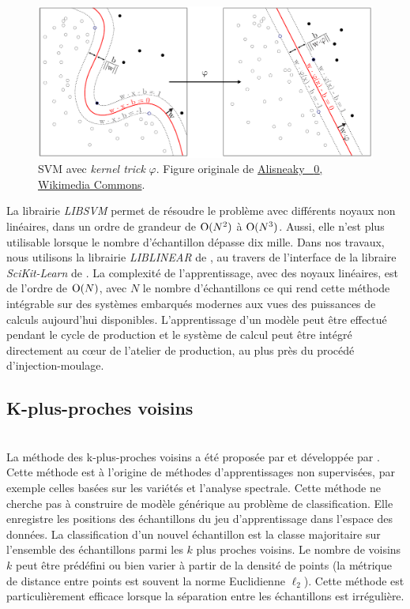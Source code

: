 \begin{figure}[hbtp]
	\centering
	\includegraphics[width=\textwidth,height=\textheight,keepaspectratio]{../Chap4/Figures/Kernel_Machine_Pierre.pdf}
	\caption{SVM avec \emph{kernel trick} $\varphi$. Figure originale de \href{https://commons.wikimedia.org/wiki/File:Kernel_Machine.png}{Alisneaky \ccLogo \ \textnormal{0}, Wikimedia Commons}.}
	\label{fig:svm}
\end{figure}

La librairie \textit{LIBSVM} \cite{chang_libsvm_2011} permet de résoudre le problème avec différents noyaux non linéaires, dans un ordre de grandeur de $\operatorname{O}(N^2)$ à $\operatorname{O}(N^3)$.
Aussi, elle n'est plus utilisable lorsque le nombre d'échantillon dépasse dix mille.
Dans nos travaux, nous utilisons la librairie \textit{LIBLINEAR} de \citeauthor{fan_liblinear_2008} \cite{fan_liblinear_2008}, au travers de l'interface de la libraire \textit{SciKit-Learn} de \citeauthor{pedregosa_scikit-learn_2011} \cite{pedregosa_scikit-learn_2011}.
La complexité de l'apprentissage, avec des noyaux linéaires, est de l'ordre de $\operatorname{O}(N)$, avec $N$ le nombre d'échantillons ce qui rend cette méthode intégrable sur des systèmes embarqués modernes aux vues des puissances de calculs aujourd'hui disponibles.
L'apprentissage d'un modèle peut être effectué pendant le cycle de production et le système de calcul peut être intégré directement au cœur de l'atelier de production, au plus près du procédé d'injection-moulage.

\subsection{K-plus-proches voisins} \mbox{} \label{parag:knn} \\
La méthode des k-plus-proches voisins a été proposée par \citeauthor{fix_discriminatory_1951} \cite{fix_discriminatory_1951} et développée par \citeauthor{cover_nearest_1967} \cite{cover_nearest_1967}.
Cette méthode est à l'origine de méthodes d'apprentissages non supervisées, par exemple celles basées sur les variétés et l'analyse spectrale.
Cette méthode ne cherche pas à construire de modèle générique au problème de classification.
Elle enregistre les positions des échantillons du jeu d'apprentissage dans l'espace des données.
La classification d'un nouvel échantillon est la classe majoritaire sur l'ensemble des échantillons parmi les $k$ plus proches voisins.
Le nombre de voisins $k$ peut être prédéfini ou bien varier à partir de la densité  de points (la métrique de distance entre points est souvent la norme Euclidienne $\ell_{2}$).
Cette méthode est particulièrement efficace lorsque la séparation entre les échantillons est irrégulière.

